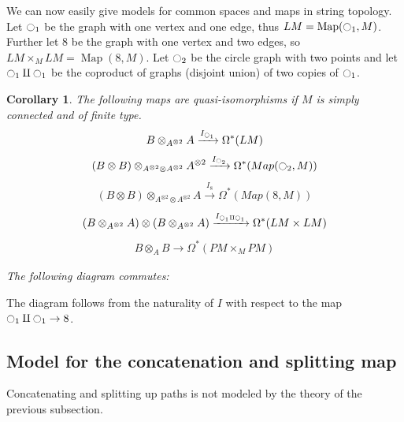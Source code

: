 \documentclass{scrartcl}
\theoremstyle{plain}
\newtheorem{corollary}[theorem]{Corollary}
\theoremstyle{definition}
\let\xto\xrightarrow
\DeclareMathOperator{\Map}{Map}
\renewcommand{\coprod}{\mathbin{\amalg}}
\begin{document}
We can now easily give models for common spaces and maps in string topology. Let $\ocircle_1$ be the graph with one vertex and one edge, thus $LM = \Map(\ocircle_1, M)$. Further let $8$ be the graph with one vertex and two edges, so $LM\times_M LM = \Map(8, M)$. Let $\ocircle_2$ be the circle graph with two points and let $\ocircle_1\coprod \ocircle_1$ be the coproduct of graphs (disjoint union) of two copies of $\ocircle_1$.
\begin{corollary}\label{lem:model-quasi-iso-examples}
    The following maps are quasi-isomorphisms if $M$ is simply connected and of finite type.
    \begin{align*}
        B\otimes_{A^{\otimes 2}} A \xto{I_{\ocircle_1}} \Omega^*(LM)
    \end{align*}
    \begin{align*}
        (B\otimes B)\otimes_{A^{\otimes 2}\otimes A^{\otimes 2}} A^{\otimes 2} \xto{I_{\ocircle_2}}\Omega^*(Map(\ocircle_2, M))
    \end{align*}
    \begin{align*}
        (B\otimes B)\otimes_{A^{\otimes 2}\otimes A^{\otimes 2}} A \xto{I_{8}} \Omega^*(Map(8, M))
    \end{align*}
    \begin{align*}
        (B\otimes_{A^{\otimes 2}}A) \otimes (B\otimes_{A^{\otimes 2}} A) \xto{I_{\ocircle_1\coprod\ocircle_1}} \Omega^*(LM\times LM)
    \end{align*}
    \begin{align*}
        B\otimes_A B\to \Omega^*(PM\times_M PM)
    \end{align*}

    The following diagram commutes:
    \begin{center}
    \end{center}
\end{corollary}
The diagram follows from the naturality of $I$ with respect to the map $\ocircle_1\coprod \ocircle_1\to 8$.


\subsection{Model for the concatenation and splitting map}\label{subsec:model-concatenation} 
Concatenating and splitting up paths is not modeled by the theory of the previous subsection. 
\end{document}
